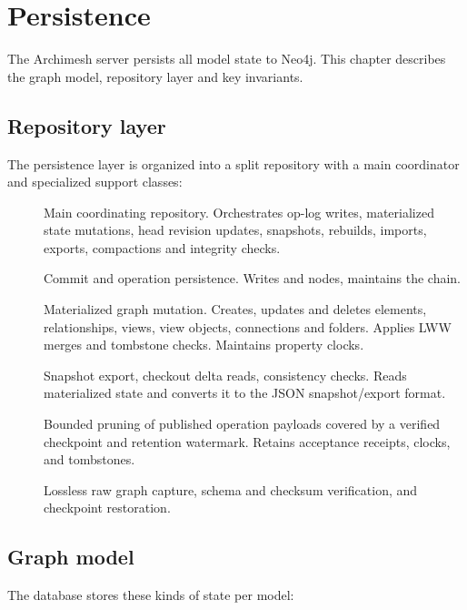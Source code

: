 \section{Persistence}
\label{sec:Persistence}

The Archimesh server persists all model state to Neo4j. This chapter describes
the graph model, repository layer and key invariants.

\subsection{Repository layer}

The persistence layer is organized into a split repository with a main
coordinator and specialized support classes:

\begin{description}
\item[] Main coordinating repository. Orchestrates
  op-log writes, materialized state mutations, head revision updates,
  snapshots, rebuilds, imports, exports, compactions and integrity checks.
\item[] Commit and operation persistence. Writes
   and  nodes, maintains the 
  chain.
\item[] Materialized graph mutation.
  Creates, updates and deletes elements, relationships, views, view objects,
  connections and folders. Applies LWW merges and tombstone checks.
  Maintains property clocks.
\item[] Snapshot export, checkout delta reads,
  consistency checks. Reads materialized state and converts it to the JSON
  snapshot/export format.
\item[] Bounded pruning of published
  operation payloads covered by a verified checkpoint and retention watermark.
  Retains acceptance receipts, clocks, and tombstones.
\item[] Lossless raw graph capture, schema
  and checksum verification, and checkpoint restoration.
\end{description}

\subsection{Graph model}

The database stores these kinds of state per model:

